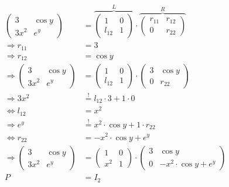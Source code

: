 \begin{align}
	\begin{pmatrix}
		3     & \cos y\\
		3 x^2 & e^y
	\end{pmatrix}
	&=
	\overbrace{\begin{pmatrix}
		1      & 0\\
		l_{12} & 1
	\end{pmatrix}}^L \cdot
	\overbrace{\begin{pmatrix}
		r_{11} & r_{12}\\
		0      & r_{22}
	\end{pmatrix}}^R\\
	\Rightarrow r_{11} &= 3\\
	\Rightarrow r_{12} &= \cos y\\
	\Rightarrow \begin{pmatrix}
		3     & \cos y\\
		3 x^2 & e^y
	\end{pmatrix}
	&=
	\begin{pmatrix}
		1      & 0\\
		l_{12} & 1
	\end{pmatrix} \cdot
	\begin{pmatrix}
		3 & \cos y\\
		0 & r_{22}
	\end{pmatrix}\\
	\Rightarrow 3x^2 &\stackrel{!}{=} l_{12} \cdot 3 + 1 \cdot 0\\
	\Leftrightarrow l_{12} &= x^2\\
	\Rightarrow e^y &\stackrel{!}{=} x^2 \cdot \cos y + 1 \cdot r_{22}\\
	\Leftrightarrow r_{22} &= -x^2 \cdot \cos y + e^y\\
	\Rightarrow \begin{pmatrix}
		3     & \cos y\\
		3 x^2 & e^y
	\end{pmatrix}
	&=
	\begin{pmatrix}
		1   & 0\\
		x^2 & 1
	\end{pmatrix} \cdot
	\begin{pmatrix}
		3 & \cos y\\
		0 & -x^2 \cdot \cos y + e^y
	\end{pmatrix}\\
	P &= I_2
\end{align}
